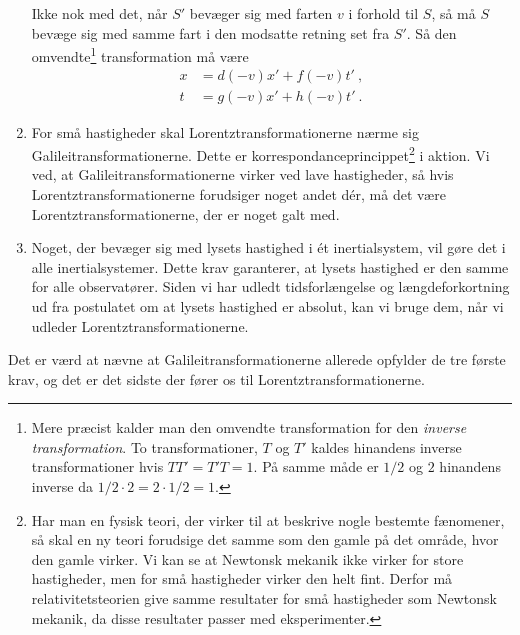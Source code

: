 \begin{enumerate}
    Ikke nok med det, når $S'$ bevæger sig med farten $v$ i forhold til $S$, så må $S$ bevæge sig med samme fart i den modsatte retning set fra $S'$.
    Så den omvendte\footnote{Mere præcist kalder man den omvendte transformation for den \textit{inverse transformation}. To transformationer, $T$ og $T'$ kaldes hinandens inverse transformationer hvis $TT' = T'T = 1$. På samme måde er $1/2$  og $2$ hinandens inverse da $1/2\cdot 2 = 2\cdot 1/2 = 1$.} transformation må være
    \begin{subequations}
    \begin{align}
        x&=d(-v)x'+f(-v)t' \:  ,\\
        t&=g(-v)x'+h(-v)t' \: .
    \end{align}
    \end{subequations}
    \item For små hastigheder skal Lorentztransformationerne nærme sig Galileitransformationerne. Dette er korrespondanceprincippet\footnote{Har man en fysisk teori, der virker til at beskrive nogle bestemte fænomener, så skal en ny teori forudsige det samme som den gamle på det område, hvor den gamle virker. Vi kan se at Newtonsk mekanik ikke virker for store hastigheder, men for små hastigheder virker den helt fint. Derfor må relativitetsteorien give samme resultater for små hastigheder som Newtonsk mekanik, da disse resultater passer med eksperimenter.} i aktion.
    Vi ved, at Galileitransformationerne virker ved lave hastigheder, så hvis Lorentztransformationerne forudsiger noget andet dér, må det være Lorentztransformationerne, der er noget galt med.
    \item Noget, der bevæger sig med lysets hastighed i ét inertialsystem, vil gøre det i alle inertialsystemer.
    Dette krav garanterer, at lysets hastighed er den samme for alle observatører.
    Siden vi har udledt tidsforlængelse og længdeforkortning ud fra postulatet om at lysets hastighed er absolut, kan vi bruge dem, når vi udleder Lorentztransformationerne.
\end{enumerate}
Det er værd at nævne at Galileitransformationerne allerede opfylder de tre første krav, og det er det sidste der fører os til Lorentztransformationerne.


